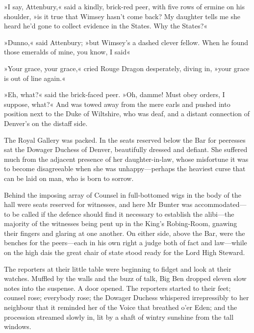 »I say, Attenbury,« said a kindly, brick-red peer, with five rows of ermine on his shoulder, »is it true that Wimsey hasn't come back?  My daughter tells me she heard he'd gone to collect evidence in the States. Why the States?«

»Dunno,« said Attenbury; »but Wimsey's a dashed clever fellow. When he found those emeralds of mine, you know, I said\longdash«

»Your grace, your grace,« cried Rouge Dragon desperately, diving in, »your grace is out of line again.«

»Eh, what?« said the brick-faced peer. »Oh, damme! Must obey orders, I suppose, what?« And was towed away from the mere earls and pushed into position next to the Duke of Wiltshire, who was deaf, and a distant connection of Denver's on the distaff side.

The Royal Gallery was packed. In the seats reserved below the Bar for peeresses sat the Dowager Duchess of Denver, beautifully dressed and defiant. She suffered much from the adjacent presence of her daughter-in-law, whose misfortune it was to become disagreeable when she was unhappy\allowbreak---\allowbreak perhaps the heaviest curse that can be laid on man, who is born to sorrow.

Behind the imposing array of Counsel in full-bottomed wigs in the body of the hall were seats reserved for witnesses, and here Mr Bunter was accommodated\allowbreak---\allowbreak to be called if the defence should find it necessary to establish the alibi\allowbreak---\allowbreak the majority of the witnesses being pent up in the King's Robing-Room, gnawing their fingers and glaring at one another.  On either side, above the Bar, were the benches for the peers\allowbreak---\allowbreak each in his own right a judge both of fact and law\allowbreak---\allowbreak while on the high dais the great chair of state stood ready for the Lord High Steward.

The reporters at their little table were beginning to fidget and look at their watches. Muffled by the walls and the buzz of talk, Big Ben dropped eleven slow notes into the suspense. A door opened.  The reporters started to their feet; counsel rose; everybody rose; the Dowager Duchess whispered irrepressibly to her neighbour that it reminded her of the Voice that breathed o'er Eden; and the procession streamed slowly in, lit by a shaft of wintry sunshine from the tall windows.

